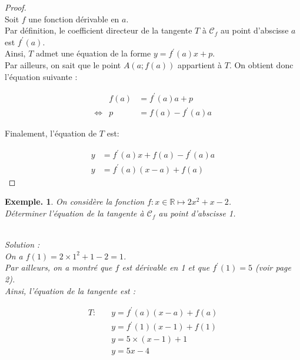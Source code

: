 \documentclass[12pt]{article}
\theoremstyle{break}
\newtheorem*{example}{Exemple.}
\begin{document}
\begin{proof}
~\\
Soit $f$ une fonction dérivable en $a$.\\
Par définition, le coefficient directeur de la tangente $T$ à $\mathcal{C}_{f}$ au point d'abscisse $a$ est $f^{\prime}(a)$.\\
Ainsi, $T$ admet une équation de la forme $y=f^{\prime}(a) x+p$.\\
Par ailleurs, on sait que le point $A(a ; f(a))$ appartient à $T$. On obtient donc l'équation suivante :

\begin{equation*}
\begin{array}{rcl}
& f(a) & =f^{\prime}(a) a+p \\
\Longleftrightarrow& p & =f(a)-f^{\prime}(a) a
\end{array}
\end{equation*}

Finalement, l'équation de $T$ est:

$$
\begin{aligned}
y & =f^{\prime}(a) x+f(a)-f^{\prime}(a) a \\
y & =f^{\prime}(a)(x-a)+f(a)
\end{aligned}
$$
\end{proof}

\begin{example}
On considère la fonction $f: x \in \mathbb{R} \longmapsto 2 x^{2}+x-2$.\\
Déterminer l'équation de la tangente à $\mathcal{C}_{f}$ au point d'abscisse 1.

~\\Solution :\\
On a $f(1)=2 \times 1^{2}+1-2=1$.\\
Par ailleurs, on a montré que $f$ est dérivable en 1 et que $f^{\prime}(1)=5$ (voir page 2).\\
Ainsi, l'équation de la tangente est :

$$
\begin{aligned}
T: \quad & y=f^{\prime}(a)(x-a)+f(a) \\
& y=f^{\prime}(1)(x-1)+f(1) \\
& y=5 \times(x-1)+1 \\
& y=5 x-4
\end{aligned}
$$
\end{example}
\end{document}
